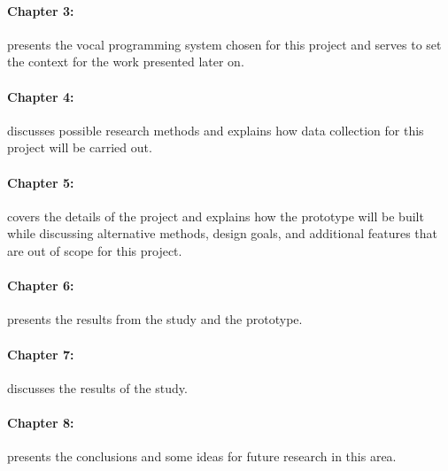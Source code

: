 \documentclass[../thesis.tex]{subfiles}
\begin{document}
\paragraph{Chapter 3: } presents the vocal programming system chosen for this project
and serves to set the context for the work presented later on.
\paragraph{Chapter 4: } discusses possible research methods and explains
how data collection for this project will be carried out.
\paragraph{Chapter 5: } covers the details of the project and explains
how the prototype will be built while discussing alternative methods, design goals,
and additional features that are out of scope for this project.
\paragraph{Chapter 6: } presents the results from the study and the prototype.
\paragraph{Chapter 7: } discusses the results of the study.
\paragraph{Chapter 8: } presents the conclusions and some ideas for future research in this area.
\end{document}
